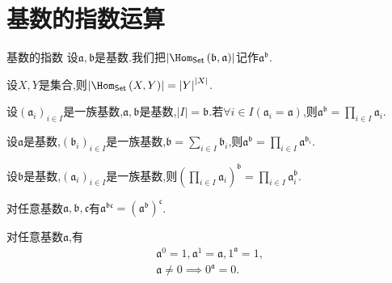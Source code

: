 \section{基数的指数运算}

\begin{definition}{基数的指数}{}
	设$\mathfrak{a},\mathfrak{b}$是基数.我们把$\left|\Hom_{\mathsf{Set}}\left(\mathfrak{b},\mathfrak{a}\right)\right|$记作$\mathfrak{a}^{\mathfrak{b}}$.
\end{definition}

\begin{proposition}{}{}
	设$X,Y$是集合,则$\left|\Hom_{\mathsf{Set}}\left(X,Y\right)\right|=\left|Y\right|^{\left|X\right|}$.
\end{proposition}

\begin{proposition}{}{}
	设$\left(\mathfrak{a}_{i}\right)_{i\in I}$是一族基数,$\mathfrak{a},\mathfrak{b}$是基数,$\left|I\right|=\mathfrak{b}$.若$\forall i\in I\left(\mathfrak{a}_{i}=\mathfrak{a}\right)$,则$\mathfrak{a}^{\mathfrak{b}}=\prod\limits_{i\in I}\mathfrak{a}_{i}$.
\end{proposition}

\begin{corollary}{}{}
	设$\mathfrak{a}$是基数,$\left(\mathfrak{b}_{i}\right)_{i\in I}$是一族基数,$\mathfrak{b}=\sum\limits_{i\in I}\mathfrak{b}_{i}$,则$\mathfrak{a}^{\mathfrak{b}}=\prod\limits_{i\in I}\mathfrak{a}^{\mathfrak{b}_{i}}$.
\end{corollary}

\begin{corollary}{}{}
	设$\mathfrak{b}$是基数,$\left(\mathfrak{a}_{i}\right)_{i\in I}$是一族基数,则$\left(\prod\limits_{i\in I}\mathfrak{a}_{i}\right)^{\mathfrak{b}}=\prod\limits_{i\in I}\mathfrak{a}_{i}^{\mathfrak{b}}$.
\end{corollary}

\begin{corollary}{}{}
	对任意基数$\mathfrak{a},\mathfrak{b},\mathfrak{c}$有$\mathfrak{a}^{\mathfrak{b}\mathfrak{c}}=\left(\mathfrak{a}^{\mathfrak{b}}\right)^{\mathfrak{c}}$.
\end{corollary}

\begin{proposition}{}{}
	对任意基数$\mathfrak{a}$,有
	\begin{gather*}
		\mathfrak{a}^{0}=1,\mathfrak{a}^{1}=\mathfrak{a},1^{\mathfrak{a}}=1,\\
		\mathfrak{a}\neq 0\implies 0^{\mathfrak{a}}=0.
	\end{gather*}
\end{proposition}

